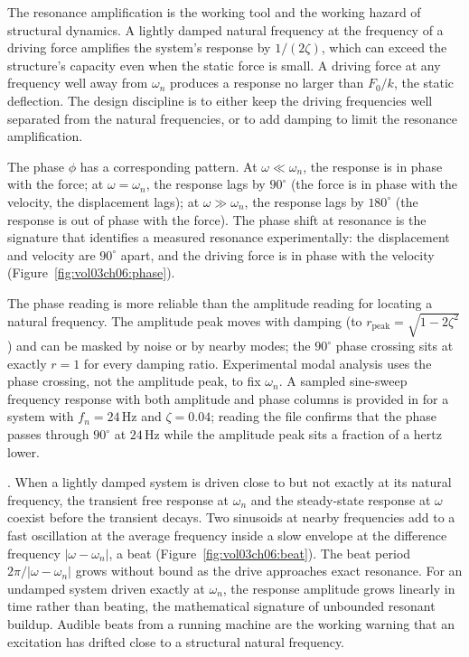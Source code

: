 The resonance amplification is the working tool and the working
hazard of structural dynamics. A lightly damped natural frequency
at the frequency of a driving force amplifies the system's response
by $1/(2\zeta)$, which can exceed the structure's capacity even when
the static force is small. A driving force at any frequency well
away from $\omega_n$ produces a response no larger than $F_0/k$,
the static deflection. The design discipline is to either keep the
driving frequencies well separated from the natural frequencies, or
to add damping to limit the resonance amplification.

The phase $\phi$ has a corresponding pattern. At $\omega \ll
\omega_n$, the response is in phase with the force; at $\omega =
\omega_n$, the response lags by $90^{\circ}$ (the force is in phase
with the velocity, the displacement lags); at $\omega \gg \omega_n$,
the response lags by $180^{\circ}$ (the response is out of phase
with the force). The phase shift at resonance is the signature that
identifies a measured resonance experimentally: the displacement
and velocity are $90^{\circ}$ apart, and the driving force is in
phase with the velocity (Figure~\ref{fig:vol03ch06:phase}).



The phase reading is more reliable than the amplitude reading for
locating a natural frequency. The amplitude peak moves with damping
(to $r_{\text{peak}} = \sqrt{1-2\zeta^2}$) and can be masked by noise
or by nearby modes; the $90^{\circ}$ phase crossing sits at exactly
$r = 1$ for every damping ratio. Experimental modal analysis uses the
phase crossing, not the amplitude peak, to fix $\omega_n$. A sampled
sine-sweep frequency response with both amplitude and phase columns
is provided in  for a system with
$f_n = 24\,\si{\hertz}$ and $\zeta = 0.04$; reading the file confirms
that the phase passes through $90^{\circ}$ at $24\,\si{\hertz}$ while
the amplitude peak sits a fraction of a hertz lower.

. When a lightly damped system is
driven close to but not exactly at its natural frequency, the
transient free response at $\omega_n$ and the steady-state response at
$\omega$ coexist before the transient decays. Two sinusoids at nearby
frequencies add to a fast oscillation at the average frequency inside
a slow envelope at the difference frequency $|\omega - \omega_n|$, a
beat (Figure~\ref{fig:vol03ch06:beat}). The beat period
$2\pi/|\omega-\omega_n|$ grows without bound as the drive approaches
exact resonance. For an undamped system driven exactly at $\omega_n$,
the response amplitude grows linearly in time rather than beating, the
mathematical signature of unbounded resonant buildup. Audible beats
from a running machine are the working warning that an excitation has
drifted close to a structural natural frequency.

